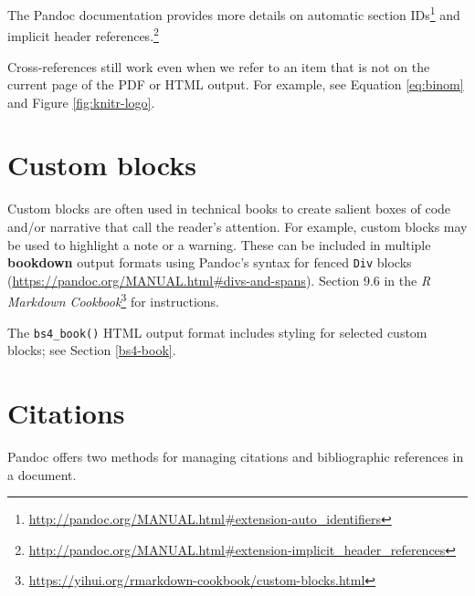 \documentclass[
  12pt,
]{krantz}
\renewcommand{\href}[2]{#2\footnote{\url{#1}}}
\theoremstyle{definition}
\theoremstyle{definition}
\theoremstyle{definition}
\theoremstyle{definition}
\theoremstyle{remark}
\begin{document}
The Pandoc documentation provides more details on \href{http://pandoc.org/MANUAL.html\#extension-auto_identifiers}{automatic section IDs} and \href{http://pandoc.org/MANUAL.html\#extension-implicit_header_references}{implicit header references.}

Cross-references still work even when we refer to an item that is not on the current page of the PDF or HTML output. For example, see Equation \eqref{eq:binom} and Figure \ref{fig:knitr-logo}.

\section{Custom blocks}\label{custom-blocks}

Custom blocks are often used in technical books to create salient boxes of code and/or narrative that call the reader's attention. For example, custom blocks may be used to highlight a note or a warning. These can be included in multiple \textbf{bookdown} output formats using Pandoc's syntax for fenced \texttt{Div} blocks (\url{https://pandoc.org/MANUAL.html\#divs-and-spans}). Section 9.6 in the \href{https://yihui.org/rmarkdown-cookbook/custom-blocks.html}{\emph{R Markdown Cookbook}} \citep{rmarkdown2020} for instructions.

The \texttt{bs4\_book()} HTML output format includes styling for selected custom blocks; see Section \ref{bs4-book}.

\section{Citations}\label{citations}

Pandoc offers two methods for managing citations and bibliographic references in a document.
\end{document}
